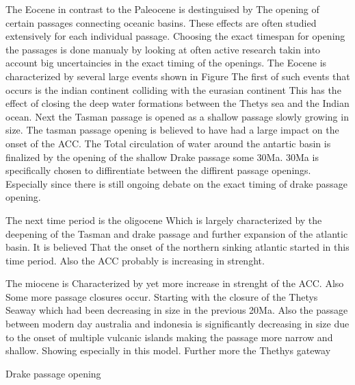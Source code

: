 
The Eocene in contrast to the Paleocene is destinguised by The opening of certain passages connecting oceanic basins. These effects are often studied extensively for each individual passage. Choosing the exact timespan for opening the passages is done manualy by looking at often active research takin into account big uncertaincies in the exact timing of the openings. The Eocene is characterized by several large events shown in Figure %
The first of such events that occurs is the indian continent colliding with the eurasian continent This has the effect of closing the deep water formations between the Thetys sea and the Indian ocean.
Next the Tasman passage is opened\cite{Lawver2003Sep} as a shallow passage slowly growing in size. The tasman passage opening is believed to have had a large impact on the onset of the ACC. The Total circulation of water around the antartic basin is finalized by the opening of the shallow Drake passage some 30Ma. 30Ma is specifically chosen to diffirentiate between the diffirent passage openings. Especially since there is still ongoing debate on the exact timing of drake passage opening.

The next time period is the oligocene Which is largely characterized by the deepening of the Tasman and drake passage and further expansion of the atlantic basin. It is believed %
That the onset of the northern sinking atlantic started in this time period. Also the ACC probably is increasing in strenght.



The miocene is Characterized by yet more increase in strenght of the ACC. Also Some more passage closures occur. Starting with the closure of the Thetys Seaway which had been decreasing in size in the previous 20Ma. Also the passage between modern day australia and indonesia is significantly decreasing in size due to the onset  of multiple vulcanic islands making the passage more narrow and shallow. Showing especially in this model. Further more the Thethys gateway



Drake passage opening \cite{Scher2006Apr}

